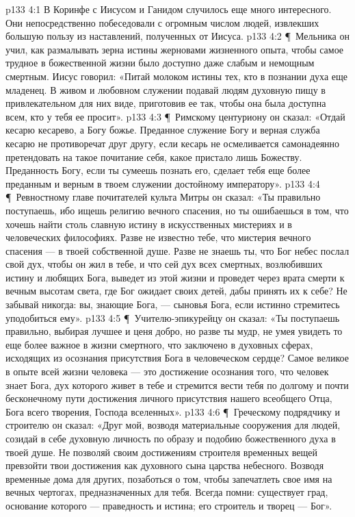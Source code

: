 \vs p133 4:1 В Коринфе с Иисусом и Ганидом случилось еще много интересного. Они непосредственно побеседовали с огромным числом людей, извлекших большую пользу из наставлений, полученных от Иисуса.
\vs p133 4:2 \P\ Мельника он учил, как размалывать зерна истины жерновами жизненного опыта, чтобы самое трудное в божественной жизни было доступно даже слабым и немощным смертным. Иисус говорил: «Питай молоком истины тех, кто в познании духа еще младенец. В живом и любовном служении подавай людям духовную пищу в привлекательном для них виде, приготовив ее так, чтобы она была доступна всем, кто у тебя ее просит».
\vs p133 4:3 \P\ Римскому центуриону он сказал: «Отдай кесарю кесарево, а Богу божье. Преданное служение Богу и верная служба кесарю не противоречат друг другу, если кесарь не осмеливается самонадеянно претендовать на такое почитание себя, какое пристало лишь Божеству. Преданность Богу, если ты сумеешь познать его, сделает тебя еще более преданным и верным в твоем служении достойному императору».
\vs p133 4:4 \P\ Ревностному главе почитателей культа Митры он сказал: «Ты правильно поступаешь, ибо ищешь религию вечного спасения, но ты ошибаешься в том, что хочешь найти столь славную истину в искусственных мистериях и в человеческих философиях. Разве не известно тебе, что мистерия вечного спасения --- в твоей собственной душе. Разве не знаешь ты, что Бог небес послал свой дух, чтобы он жил в тебе, и что сей дух всех смертных, возлюбивших истину и любящих Бога, выведет из этой жизни и проведет через врата смерти к вечным высотам света, где Бог ожидает своих детей, дабы принять их к себе? Не забывай никогда: вы, знающие Бога, --- сыновья Бога, если истинно стремитесь уподобиться ему».
\vs p133 4:5 \P\ Учителю\hyp{}эпикурейцу он сказал: «Ты поступаешь правильно, выбирая лучшее и ценя добро, но разве ты мудр, не умея увидеть то еще более важное в жизни смертного, что заключено в духовных сферах, исходящих из осознания присутствия Бога в человеческом сердце? Самое великое в опыте всей жизни человека --- это достижение осознания того, что человек знает Бога, дух которого живет в тебе и стремится вести тебя по долгому и почти бесконечному пути достижения личного присутствия нашего всеобщего Отца, Бога всего творения, Господа вселенных».
\vs p133 4:6 \P\ Греческому подрядчику и строителю он сказал: «Друг мой, возводя материальные сооружения для людей, созидай в себе духовную личность по образу и подобию божественного духа в твоей душе. Не позволяй своим достижениям строителя временных вещей превзойти твои достижения как духовного сына царства небесного. Возводя временные дома для других, позаботься о том, чтобы запечатлеть свое имя на вечных чертогах, предназначенных для тебя. Всегда помни: существует град, основание которого --- праведность и истина; его строитель и творец --- Бог».
